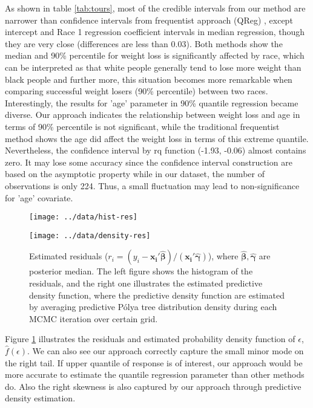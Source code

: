 \documentclass[12pt]{article}
\newcommand{\polya}{P\'{o}lya}
\begin{document}
As shown in table \ref{tab:tours}, most of the credible intervals from our
method are narrower than confidence intervals from frequentist approach
(QReg) , except intercept and Race 1 regression coefficient intervals
in median regression, though they are very close (differences are less than
0.03). Both methods  show the median  
and 90\% percentile for weight loss is significantly  affected by
race, which can be interpreted as that white people generally tend to
lose more weight than black people and further more, this situation
becomes more remarkable when comparing successful weight losers (90\%
percentile) between two races. Interestingly, the results for 'age'
parameter in 90\% quantile regression became diverse. Our approach
indicates the relationship between weight loss and age in terms of
90\% percentile is not significant, while the traditional frequentist
method shows the age did affect the weight loss in terms of this
extreme quantile. Nevertheless, the confidence interval by rq function
(-1.93, -0.06) almost contains zero. It may lose some  accuracy since
the confidence interval construction are based on the asymptotic
property while in our dataset, the number of observations is only
224. Thus, a small fluctuation may lead to  non-significance for 'age'
covariate. 

\begin{figure}[htbp]
  \begin{minipage}{0.5\linewidth}
    \centerline{\texttt{[image: ../data/hist-res]}}
  \end{minipage}
  \begin{minipage}{0.5\linewidth}
    \centerline{\texttt{[image: ../data/density-res]}}
  \end{minipage}
  \caption[]{\label{fig:tourpost} Estimated residuals ($r_i = (y_i-
    \bm{x_i'\hat{\beta}})/(\bm{x_i'\hat{\gamma}})$), where
    $\hat{\bm{\beta}}, \hat{\bm{\gamma}}$ are posterior median. The left
    figure shows the histogram of the residuals, and the right one
    illustrates the estimated predictive density function, where the
    predictive density function are estimated by averaging predictive
    \polya{} tree distribution density during each MCMC iteration over
    certain grid.}
\end{figure}

Figure \ref{fig:tourpost} illustrates the residuals and estimated
probability density function of $\epsilon$, $\hat{f}(\epsilon)$. We
can also see our approach correctly capture the small minor mode on
the right tail. If upper quantile of response is of interest, our
approach would be more accurate to estimate the quantile regression
parameter than other methods do. Also the right skewness is also
captured by our approach through predictive density estimation. 
\end{document}
